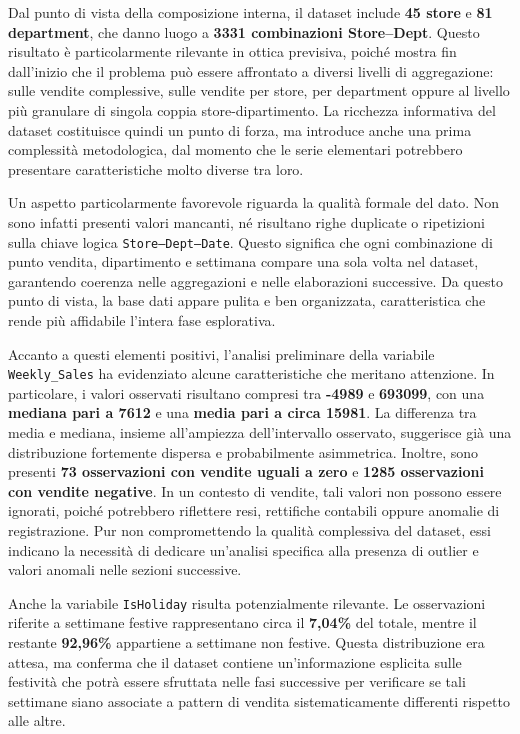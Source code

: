 \documentclass[a4paper,12pt]{article}
\begin{document}
Dal punto di vista della composizione interna, il dataset include \textbf{45 store} e \textbf{81 department}, che danno luogo a \textbf{3331 combinazioni Store--Dept}. Questo risultato è particolarmente rilevante in ottica previsiva, poiché mostra fin dall’inizio che il problema può essere affrontato a diversi livelli di aggregazione: sulle vendite complessive, sulle vendite per store, per department oppure al livello più granulare di singola coppia store-dipartimento. La ricchezza informativa del dataset costituisce quindi un punto di forza, ma introduce anche una prima complessità metodologica, dal momento che le serie elementari potrebbero presentare caratteristiche molto diverse tra loro.

Un aspetto particolarmente favorevole riguarda la qualità formale del dato. Non sono infatti presenti valori mancanti, né risultano righe duplicate o ripetizioni sulla chiave logica \texttt{Store--Dept--Date}. Questo significa che ogni combinazione di punto vendita, dipartimento e settimana compare una sola volta nel dataset, garantendo coerenza nelle aggregazioni e nelle elaborazioni successive. Da questo punto di vista, la base dati appare pulita e ben organizzata, caratteristica che rende più affidabile l’intera fase esplorativa.

Accanto a questi elementi positivi, l’analisi preliminare della variabile \texttt{Weekly\_Sales} ha evidenziato alcune caratteristiche che meritano attenzione. In particolare, i valori osservati risultano compresi tra \textbf{-4989} e \textbf{693099}, con una \textbf{mediana pari a 7612} e una \textbf{media pari a circa 15981}. La differenza tra media e mediana, insieme all’ampiezza dell’intervallo osservato, suggerisce già una distribuzione fortemente dispersa e probabilmente asimmetrica. Inoltre, sono presenti \textbf{73 osservazioni con vendite uguali a zero} e \textbf{1285 osservazioni con vendite negative}. In un contesto di vendite, tali valori non possono essere ignorati, poiché potrebbero riflettere resi, rettifiche contabili oppure anomalie di registrazione. Pur non compromettendo la qualità complessiva del dataset, essi indicano la necessità di dedicare un’analisi specifica alla presenza di outlier e valori anomali nelle sezioni successive.

Anche la variabile \texttt{IsHoliday} risulta potenzialmente rilevante. Le osservazioni riferite a settimane festive rappresentano circa il \textbf{7,04\%} del totale, mentre il restante \textbf{92,96\%} appartiene a settimane non festive. Questa distribuzione era attesa, ma conferma che il dataset contiene un’informazione esplicita sulle festività che potrà essere sfruttata nelle fasi successive per verificare se tali settimane siano associate a pattern di vendita sistematicamente differenti rispetto alle altre.
\end{document}
